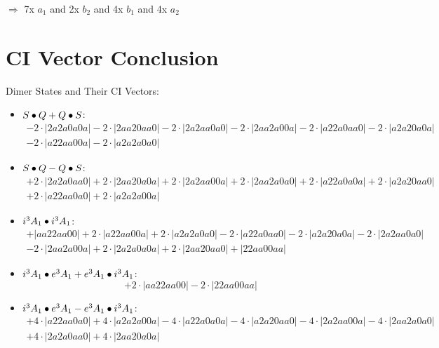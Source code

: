 \documentclass{article}
\begin{document}
$\Rightarrow{}$ 7x $a_1$ and 2x $b_2$ and 4x $b_1$ and 4x $a_2$


\newpage
\section{CI Vector Conclusion} 
Dimer States and Their CI Vectors:
\begin{itemize}
\item \boldmath$S \bullet Q + Q \bullet S \displaystyle $\unboldmath : \quad$$\begin{array}{c}
-2 \cdot \left|2a2a0a0a\right| -2 \cdot \left|2aa20aa0\right| -2 \cdot \left|2a2aa0a0\right| -2 \cdot \left|2aa2a00a\right| -2 \cdot \left|a22a0aa0\right| -2 \cdot \left|a2a20a0a\right| \\[0.5cm] -2 \cdot \left|a22aa00a\right| -2 \cdot \left|a2a2a0a0\right|
\end{array}$$
\item \boldmath$S \bullet Q - Q \bullet S \displaystyle $\unboldmath : \quad$$\begin{array}{c}
+2 \cdot \left|2a2a0aa0\right| +2 \cdot \left|2aa20a0a\right| +2 \cdot \left|2a2aa00a\right| +2 \cdot \left|2aa2a0a0\right| +2 \cdot \left|a22a0a0a\right| +2 \cdot \left|a2a20aa0\right| \\[0.5cm] +2 \cdot \left|a22aa0a0\right| +2 \cdot \left|a2a2a00a\right|
\end{array}$$
\item \boldmath$i^3 A_1 \bullet i^3 A_1 \displaystyle $\unboldmath : \quad$$\begin{array}{c}
+\left|aa22aa00\right| +2 \cdot \left|a22aa00a\right| +2 \cdot \left|a2a2a0a0\right| -2 \cdot \left|a22a0aa0\right| -2 \cdot \left|a2a20a0a\right| -2 \cdot \left|2a2aa0a0\right| \\[0.5cm] -2 \cdot \left|2aa2a00a\right| +2 \cdot \left|2a2a0a0a\right| +2 \cdot \left|2aa20aa0\right| +\left|22aa00aa\right|
\end{array}$$
\item \boldmath$i^3 A_1 \bullet e^3 A_1 + e^3 A_1 \bullet i^3 A_1 \displaystyle $\unboldmath : \quad$$+2 \cdot \left|aa22aa00\right| -2 \cdot \left|22aa00aa\right|$$
\item \boldmath$i^3 A_1 \bullet e^3 A_1 - e^3 A_1 \bullet i^3 A_1 \displaystyle $\unboldmath : \quad$$\begin{array}{c}
+4 \cdot \left|a22aa0a0\right| +4 \cdot \left|a2a2a00a\right| -4 \cdot \left|a22a0a0a\right| -4 \cdot \left|a2a20aa0\right| -4 \cdot \left|2a2aa00a\right| -4 \cdot \left|2aa2a0a0\right| \\[0.5cm] +4 \cdot \left|2a2a0aa0\right| +4 \cdot \left|2aa20a0a\right|

\end{array}$$
\end{itemize}
\end{document}
